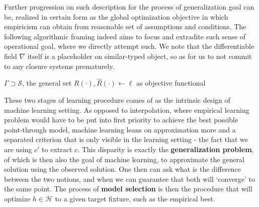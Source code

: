 Further progression on such description for the process of generalization goal can be, realized in certain form as the global optimization objective in which empiricism can obtain from reasonable set of assumptions and conditions. The following algorithmic framing indeed aims to focus and extradite such sense of operational goal, where we directly attempt such. We note that the differentiable field $\nabla$ itself is a placeholder on similar-typed object, so as for us to not commit to any closure systems prematurely. 

\begin{algorithm}[htb]
    \renewcommand{\algorithmcfname}{Optimization problem}
    \caption{Empirical-generalization learning dynamics (non-proxy)}
    \Begin
    {
        $\Gamma\supset \mathcal{S}$, the general set\;
        $R(\cdot),\hat{R}(\cdot)\gets\ell$ as objective functional\;
    }
    \label{algo:algo_optim_ideal}
\end{algorithm}

These two stages of learning procedure comes of as the intrinsic design of machine learning setting. As opposed to interpolation, where empirical learning problem would have to be put into first priority to achieve the best possible point-through model, machine learning leans on approximation more and a separated criterion that is only visible in the learning setting - the fact that we are using $c'$ to extract $c$. This disparity is exactly the \textbf{generalization problem}, of which is then also the goal of machine learning, to approximate the general solution using the observed solution. One then can ask what is the difference between the two notions, and when we can guarantee that both will `converge' to the same point. The process of \textbf{model selection} is then the procedure that will optimize $h\in \mathcal{H}$ to a given target fixture, such as the empirical best. 

